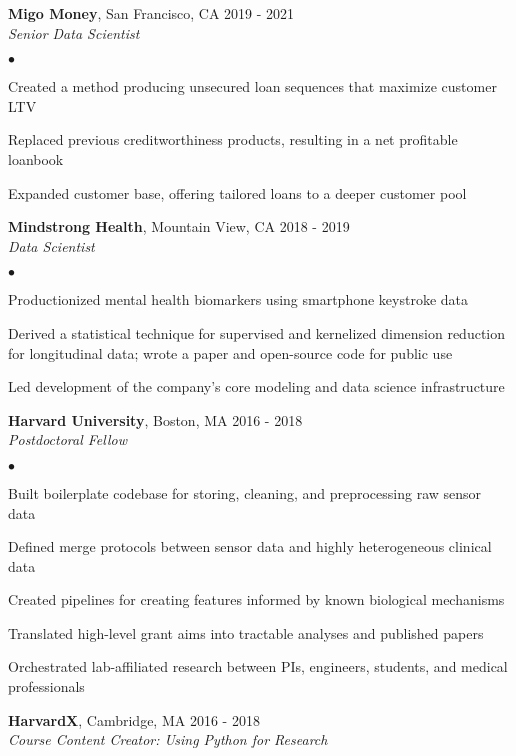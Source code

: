 \documentclass[margin,line]{res}
\newenvironment{bulletlist}{
  \begin{list}{$\bullet$}{%
      \setlength{\itemsep}{0cm}
      \setlength{\parsep}{0cm}
      \setlength{\parskip}{0cm}
      \setlength{\topsep}{0cm}
      \setlength{\partopsep}{0cm}
      \setlength{\leftmargin}{0.15in}
      \setlength{\labelwidth}{0.05in}
      \setlength{\labelsep}{0.1in}
      \setlength{\itemindent}{0in}
      \setlength{\rightmargin}{0in}}}
  {\end{list}}
\begin{document}
\begin{resume}
{\bf Migo Money}, San Francisco, CA \hfill{2019 - 2021 }\\
\textit{Senior Data Scientist} \\[-.35cm]
\begin{bulletlist}
\item Created a method producing unsecured loan sequences that maximize customer LTV
\item Replaced previous creditworthiness products, resulting in a net profitable loanbook
\item Expanded customer base, offering tailored loans to a deeper customer pool
\end{bulletlist}
\vspace{-0.1cm}

{\bf Mindstrong Health}, Mountain View, CA \hfill {2018 - 2019}\\
\textit{Data Scientist} \\[-.35cm]
\begin{bulletlist}
\item Productionized mental health biomarkers using smartphone keystroke data
\item Derived a statistical technique for supervised and kernelized dimension reduction for longitudinal data; wrote a paper and open-source code for public use
\item Led development of the company's core modeling and data science infrastructure
\end{bulletlist}

{\bf Harvard University}, Boston, MA  \hfill 2016 - 2018\\
\textit{Postdoctoral Fellow} \\[-.35cm]
\begin{bulletlist}
\item Built boilerplate codebase for storing, cleaning, and preprocessing raw sensor data
\item Defined merge protocols between sensor data and highly heterogeneous clinical data
\item Created pipelines for creating features informed by known biological mechanisms
\item Translated high-level grant aims into tractable analyses and published papers
\item Orchestrated lab-affiliated research between PIs, engineers, students, and medical professionals
\end{bulletlist}

{\bf HarvardX}, Cambridge, MA  \hfill 2016 - 2018\\
\textit{Course Content Creator: Using Python for Research}


\end{resume}
\end{document}
